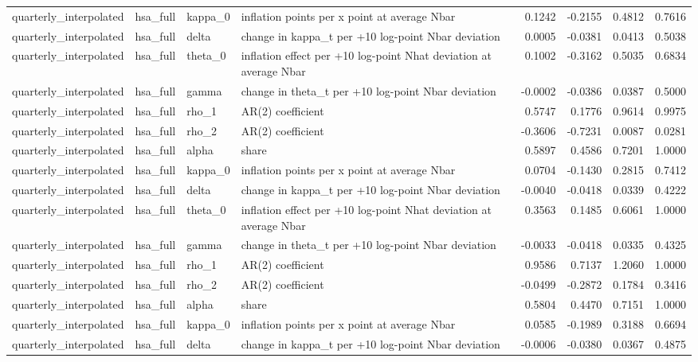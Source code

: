 \begin{tabular}{llllrrrr}
quarterly\_interpolated & hsa\_full & kappa\_0 & inflation points per x point at average Nbar & 0.1242 & -0.2155 & 0.4812 & 0.7616 \\
quarterly\_interpolated & hsa\_full & delta & change in kappa\_t per +10 log-point Nbar deviation & 0.0005 & -0.0381 & 0.0413 & 0.5038 \\
quarterly\_interpolated & hsa\_full & theta\_0 & inflation effect per +10 log-point Nhat deviation at average Nbar & 0.1002 & -0.3162 & 0.5035 & 0.6834 \\
quarterly\_interpolated & hsa\_full & gamma & change in theta\_t per +10 log-point Nbar deviation & -0.0002 & -0.0386 & 0.0387 & 0.5000 \\
quarterly\_interpolated & hsa\_full & rho\_1 & AR(2) coefficient & 0.5747 & 0.1776 & 0.9614 & 0.9975 \\
quarterly\_interpolated & hsa\_full & rho\_2 & AR(2) coefficient & -0.3606 & -0.7231 & 0.0087 & 0.0281 \\
quarterly\_interpolated & hsa\_full & alpha & share & 0.5897 & 0.4586 & 0.7201 & 1.0000 \\
quarterly\_interpolated & hsa\_full & kappa\_0 & inflation points per x point at average Nbar & 0.0704 & -0.1430 & 0.2815 & 0.7412 \\
quarterly\_interpolated & hsa\_full & delta & change in kappa\_t per +10 log-point Nbar deviation & -0.0040 & -0.0418 & 0.0339 & 0.4222 \\
quarterly\_interpolated & hsa\_full & theta\_0 & inflation effect per +10 log-point Nhat deviation at average Nbar & 0.3563 & 0.1485 & 0.6061 & 1.0000 \\
quarterly\_interpolated & hsa\_full & gamma & change in theta\_t per +10 log-point Nbar deviation & -0.0033 & -0.0418 & 0.0335 & 0.4325 \\
quarterly\_interpolated & hsa\_full & rho\_1 & AR(2) coefficient & 0.9586 & 0.7137 & 1.2060 & 1.0000 \\
quarterly\_interpolated & hsa\_full & rho\_2 & AR(2) coefficient & -0.0499 & -0.2872 & 0.1784 & 0.3416 \\
quarterly\_interpolated & hsa\_full & alpha & share & 0.5804 & 0.4470 & 0.7151 & 1.0000 \\
quarterly\_interpolated & hsa\_full & kappa\_0 & inflation points per x point at average Nbar & 0.0585 & -0.1989 & 0.3188 & 0.6694 \\
quarterly\_interpolated & hsa\_full & delta & change in kappa\_t per +10 log-point Nbar deviation & -0.0006 & -0.0380 & 0.0367 & 0.4875 \\

\end{tabular}

